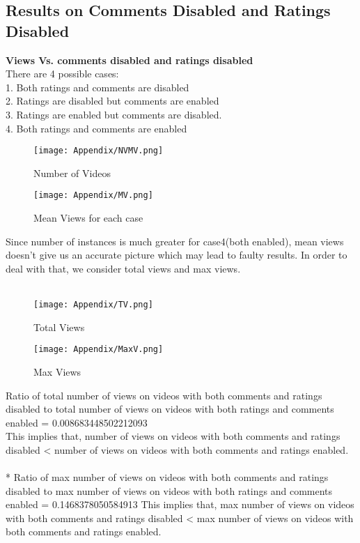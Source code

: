 \documentclass[runningheads]{llncs}
\begin{document}
\subsection {Results on Comments Disabled and Ratings Disabled}
\textbf{Views Vs. comments disabled and ratings disabled}\\
    There are 4 possible cases: \\
    1. Both ratings and comments are disabled \\
    2. Ratings are disabled but comments are enabled \\
    3. Ratings are enabled but comments are disabled. \\
    4. Both ratings and comments are enabled \\
\begin{figure}[H]
\centering
\begin{minipage}{.5\textwidth}
  \centering
  \texttt{[image: Appendix/NVMV.png]}
  \caption{Number of Videos}
\end{minipage}%
\begin{minipage}{.5\textwidth}
  \centering
  \texttt{[image: Appendix/MV.png]}
  \caption{Mean Views for each case}
\end{minipage}
\end{figure}

Since number of instances is much greater for case4(both enabled), mean views doesn't give us an accurate picture which may lead to faulty results. In order to deal with that, we consider total views and max views.\\
\\
\begin{figure}[H]
\centering
\begin{minipage}{.5\textwidth}
  \centering
  \texttt{[image: Appendix/TV.png]}
  \caption{Total Views}
\end{minipage}%
\begin{minipage}{.5\textwidth}
  \centering
  \texttt{[image: Appendix/MaxV.png]}
   \caption{Max Views}
\end{minipage}
\end{figure}

Ratio of total number of views on videos with both comments and ratings disabled to total number of views on videos with both ratings and comments enabled =  0.008683448502212093\\
This implies that, number of views on videos with both comments and ratings disabled < number of views on videos with both comments and ratings enabled.\\
\\*
Ratio of max number of views on videos with both comments and ratings disabled to max number of views on videos  with both ratings and comments enabled =  0.1468378050584913
This implies that, max number of views on videos with both comments and ratings disabled < max number of views on videos with both comments and ratings enabled.\\
\end{document}
